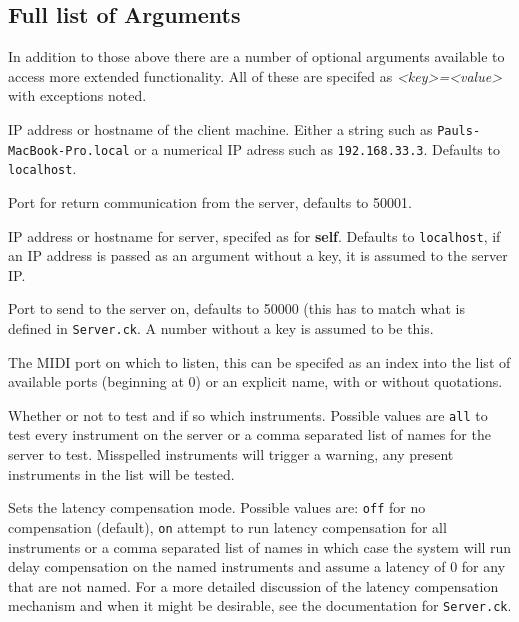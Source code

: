 \documentclass{article}
\begin{document}
\subsection{Full list of Arguments}
In addition to those above there are a number of optional arguments available to access more extended functionality. All of these are specifed as \emph{<key>=<value>} with exceptions
noted.
\begin{description} [style=multiline, labelwidth=\widthof{\bfseries server}]
	\item[self] IP address or hostname of the client machine. Either a string such as \texttt{Pauls-MacBook-Pro.local} or a numerical IP adress such as \texttt{192.168.33.3}. 
			Defaults to \texttt{localhost}.
	\item[in] Port for return communication from the server, defaults to 50001.
	\item[server] IP address or hostname for server, specifed as for \textbf{self}. Defaults to \texttt{localhost}, if an IP address is passed as an argument without a key, it is assumed to 
			    the server IP.
	\item[out] Port to send to the server on, defaults to 50000 (this has to match what is defined in \texttt{Server.ck}. A number without a key is assumed to be this.
	\item[midi] The MIDI port on which to listen, this can be specifed as an index into the list of available ports (beginning at 0) or an explicit name, with or without quotations.
	\item[test] Whether or not to test and if so which instruments. Possible values are \texttt{all} to test every instrument on the server or a comma separated list of names
			for the server to test. Misspelled instruments will trigger a warning, any present instruments in the list will be tested.
	\item[delay] Sets the latency compensation mode. Possible values are: \texttt{off} for no compensation (default), \texttt{on} attempt to run latency compensation for all instruments
			   or a comma separated list of names in which case the system will run delay compensation on the named instruments and assume a latency of 0 for any that are
			   not named. For a more detailed discussion of the latency compensation mechanism and when it might be desirable, see the documentation for \texttt{Server.ck}.
\end{description}
\end{document}
